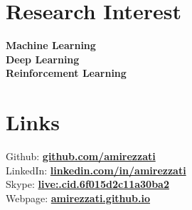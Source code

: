 \documentclass[letterpaper]{resume} %
\begin{document}
\begin{minipage}[t]{0.42\textwidth}
\section{Research Interest}
{\bf Machine Learning} \\
{\bf Deep Learning} \\
{\bf Reinforcement Learning} \\

\sectionspace %

\section{Links} 

Github: \href{https://github.com/amirezzati}{\bf github.com/amirezzati} \\
LinkedIn: \href{https://www.linkedin.com/in/amirezzati}{\bf linkedin.com/in/amirezzati} \\
Skype: \href{https://join.skype.com/invite/mngKOYpKn06k}{\bf live:.cid.6f015d2c11a30ba2} \\
Webpage: \href{https://amirezzati.github.io}{\bf amirezzati.github.io} \\

\sectionspace %


\end{minipage} %
\hfill
%
%
\end{document}

